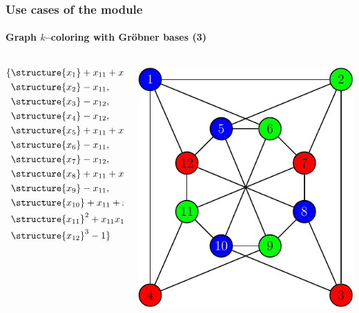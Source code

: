 \documentclass[10pt,polish]{beamer}
\begin{document}
\begin{frame}
    \frametitle{Use cases of the module}
    \framesubtitle{Graph $k$--coloring with Gr\"{o}bner bases (3)}

    \begin{columns}
        \begin{column}[l]{0.4\textwidth}
            \begin{align*}
                \{& \structure{x_{1}} + x_{11} + x_{12},              \\
                  & \structure{x_{2}} - x_{11},                       \\
                  & \structure{x_{3}} - x_{12},                       \\
                  & \structure{x_{4}} - x_{12},                       \\
                  & \structure{x_{5}} + x_{11} + x_{12},              \\
                  & \structure{x_{6}} - x_{11},                       \\
                  & \structure{x_{7}} - x_{12},                       \\
                  & \structure{x_{8}} + x_{11} + x_{12},              \\
                  & \structure{x_{9}} - x_{11},                       \\
                  & \structure{x_{10}} + x_{11} + x_{12},             \\
                  & \structure{x_{11}}^2 + x_{11} x_{12} + x_{12}^2,  \\
                  & \structure{x_{12}}^3 - 1 \}
            \end{align*}
        \end{column}
        \begin{column}[r]{0.4\textwidth}
            \begin{center}
                \includegraphics[scale=0.6]{images/graph-color.pdf}

\end{center}
\end{column}
\end{columns}
\end{frame}
\end{document}
